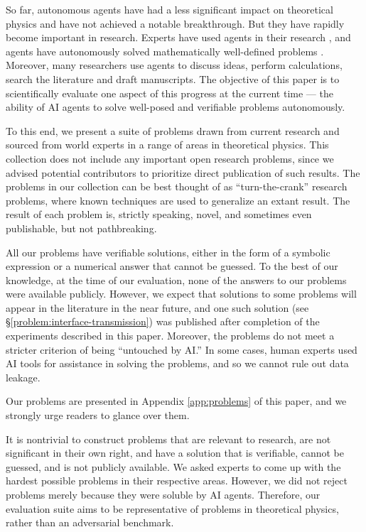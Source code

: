 \documentclass[aps,prd,reprint,superscriptaddress,nofootinbib]{revtex4-2}
\newcommand{\problemsymbol}{\S}
\DeclareRobustCommand{\problemref}[1]{\hyperref[#1]{\mbox{\problemsymbol\ref*{#1}}}}
\begin{document}
So far, autonomous agents have had a less significant impact on theoretical physics and have not achieved a notable breakthrough. But they have rapidly become important in research. Experts have used agents in their research \cite{parisi2026jamming,chen2026veneziano,craig2026gaugeinvariant}, and agents have autonomously solved mathematically well-defined problems \cite{vonhippel2026nineloops}. Moreover, many researchers use agents to discuss ideas, perform calculations, search the literature and draft manuscripts. The objective of this paper is to scientifically evaluate one aspect of this progress at the current time --- the ability of AI agents to solve well-posed and verifiable problems autonomously. 

To this end, we present a suite of problems drawn from current research and sourced from world experts in a range of areas in theoretical physics. This collection does not include any important open research problems, since we advised potential contributors to prioritize direct publication of such results. The problems in our collection can be best thought of as ``turn-the-crank'' research problems, where known techniques are used to generalize an extant result. The result of each problem is, strictly speaking, novel, and sometimes even publishable, but not pathbreaking.

All our problems have verifiable solutions, either in the form of a symbolic expression or a numerical answer that cannot be guessed. To the best of our knowledge, at the time of our evaluation, none of the answers to our problems were available publicly. However, we expect that solutions to some problems will appear in the literature in the near future, and one such solution (see \problemref{problem:interface-transmission}) was published after completion of the experiments described in this paper. Moreover, the problems do not meet a stricter criterion of being ``untouched by AI.'' In some cases, human experts used AI tools for assistance in solving the problems, and so we cannot rule out data leakage.

Our problems are presented in Appendix \ref{app:problems} of this paper, and we strongly urge readers to glance over them.

It is nontrivial to construct problems that are relevant to research, are not significant in their own right, and have a solution that is verifiable, cannot be guessed, and is not publicly available. We asked experts to come up with the hardest possible problems in their respective areas. However, we did not reject problems merely because they were soluble by AI agents. Therefore, our evaluation suite aims to be representative of problems in theoretical physics, rather than an adversarial benchmark.
\end{document}
